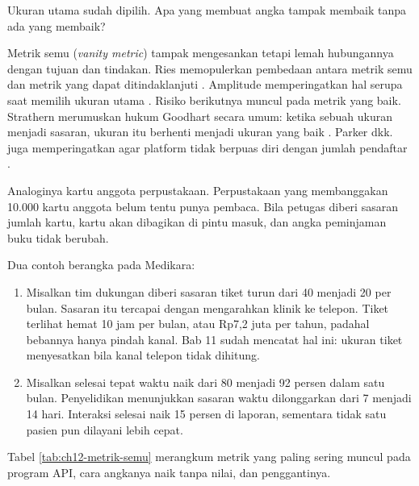 Ukuran utama sudah dipilih. Apa yang membuat angka tampak membaik tanpa ada yang membaik?

Metrik semu (\textit{vanity metric}) tampak mengesankan tetapi lemah hubungannya dengan tujuan dan tindakan. Ries memopulerkan pembedaan antara metrik semu dan metrik yang
dapat ditindaklanjuti \cite{c12-ries2011}. Amplitude memperingatkan hal serupa saat memilih ukuran utama \cite{c12-amplitude-nsm}. Risiko berikutnya muncul pada metrik yang baik. Strathern merumuskan
hukum Goodhart secara umum: ketika sebuah ukuran menjadi sasaran, ukuran itu berhenti menjadi ukuran yang baik \cite{c12-strathern1997}. Parker dkk. juga memperingatkan agar
platform tidak berpuas diri dengan jumlah pendaftar \cite{parker2016platform}.

Analoginya kartu anggota perpustakaan. Perpustakaan yang membanggakan 10.000 kartu anggota belum tentu punya pembaca. Bila petugas diberi sasaran jumlah kartu, kartu akan
dibagikan di pintu masuk, dan angka peminjaman buku tidak berubah.

Dua contoh berangka pada Medikara:
\begin{enumerate}
  \item Misalkan tim dukungan diberi sasaran tiket turun dari 40 menjadi 20 per bulan. Sasaran itu tercapai dengan mengarahkan klinik ke telepon. Tiket terlihat hemat 10 jam per
        bulan, atau Rp7,2 juta per tahun, padahal bebannya hanya pindah kanal. Bab 11 sudah mencatat hal ini: ukuran tiket menyesatkan bila kanal telepon tidak dihitung.
  \item Misalkan selesai tepat waktu naik dari 80 menjadi 92 persen dalam satu bulan. Penyelidikan menunjukkan sasaran waktu dilonggarkan dari 7 menjadi 14 hari. Interaksi selesai
        naik 15 persen di laporan, sementara tidak satu pasien pun dilayani lebih cepat.
\end{enumerate}

Tabel \ref{tab:ch12-metrik-semu} merangkum metrik yang paling sering muncul pada program API, cara angkanya naik tanpa nilai, dan penggantinya.

